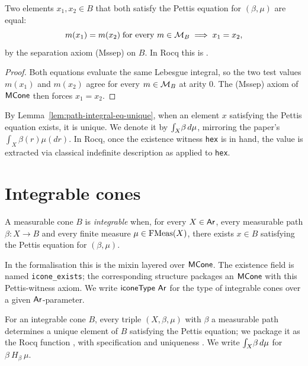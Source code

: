\begin{lemma}\label{lem:path-integral-eq-unique}
Two elements $x_1, x_2 \in B$ that both satisfy the Pettis equation
for $(\beta, \mu)$ are equal:
\[
  m(x_1) = m(x_2) \;\text{for every } m \in \mathcal{M}_B \;\Longrightarrow\; x_1 = x_2,
\]
by the separation axiom (Mssep) on $B$. In Rocq this is
. \rocqok
\end{lemma}

\begin{proof}
Both equations evaluate the same Lebesgue integral, so the two test
values $m(x_1)$ and $m(x_2)$ agree for every $m \in \mathcal{M}_B$ at
arity $0$. The (Mssep) axiom of $\mathsf{MCone}$ then forces $x_1 = x_2$.
\end{proof}

By Lemma~\ref{lem:path-integral-eq-unique}, when an element $x$
satisfying the Pettis equation exists, it is unique. We denote it by
$\int_{X}\!\beta\,d\mu$, mirroring the paper's
$\int_X \beta(r)\mu(dr)$. In Rocq, once the existence witness
\texttt{hex} is in hand, the value is extracted via classical
indefinite description as 
applied to \texttt{hex}.

\section{Integrable cones}\label{sec:icones}

\begin{definition}\label{def:icone}
A measurable cone $B$ is \emph{integrable} when, for every
$X \in \mathsf{Ar}$, every measurable path $\beta : X \to B$ and every
finite measure $\mu \in \mathrm{FMeas}(X)$, there exists $x \in B$
satisfying the Pettis equation for $(\beta, \mu)$.

In the formalisation this is the \HB{} mixin
 layered over $\mathsf{MCone}$. The
existence field is named \texttt{icone\_exists}; the corresponding
structure  packages an $\mathsf{MCone}$ with
this Pettis-witness axiom. We write $\mathsf{iconeType}\ \mathsf{Ar}$ for the type of
integrable cones over a given $\mathsf{Ar}$-parameter. \rocqok
\end{definition}

For an integrable cone $B$, every triple $(X, \beta, \mu)$ with
$\beta$ a measurable path determines a unique element of $B$
satisfying the Pettis equation; we package it as the Rocq function
, with specification
 and uniqueness
. We write
$\int_{X}\!\beta\,d\mu$ for 
$\beta\ H_\beta\ \mu$.

